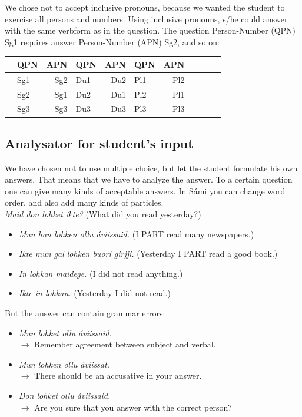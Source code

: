 \documentclass[a4paper,12pt]{article}
\begin{document}
We chose not to accept inclusive pronouns, because we wanted the student to exercise all persons and numbers. Using inclusive pronouns, s/he could answer with the same verbform as in the question. The question Person-Number (QPN) Sg1 requires answer Person-Number (APN) Sg2, and so on:\\


\begin{tabular}[t]{rlrlrlrlrlr}
&QPN &APN &QPN &APN &QPN &APN \\
\hline
&Sg1 &Sg2 &Du1 &Du2 &Pl1 &Pl2 \\
&Sg2 &Sg1 &Du2 &Du1 &Pl2 &Pl1 \\
&Sg3 &Sg3 &Du3 &Du3 &Pl3 &Pl3 \\
\end{tabular}

\subsection{Analysator for student's input}
We have chosen not to use multiple choice, but let the student formulate his own answers. That means that we have to analyze the answer. To a certain question one can give many kinds of acceptable answers. In Sámi you can change word order, and also add many kinds of particles.\\

\textit{Maid don lohket ikte?} (What did you read yesterday?)
\begin{itemize}
\item \textit{Mun han lohken ollu áviissaid.} (I PART read many newspapers.)
\item \textit{Ikte mun gal lohken buori girjji.} (Yesterday I PART read a good book.)
\item \textit{In lohkan maidege.} (I did not read anything.)
\item \textit{Ikte in lohkan.} (Yesterday I did not read.)
\end{itemize}


But the answer can contain grammar errors:
\begin{itemize}
\item \textit{Mun lohket ollu áviissaid.} \\ $\rightarrow$ Remember agreement between subject and verbal.  
\item \textit{Mun lohken ollu áviissat.} \\ $\rightarrow$ There should be an accusative in your answer. 
\item \textit{Don lohket ollu áviissaid.} \\ $\rightarrow$ Are you sure that you answer with the correct person?  
\end{itemize}
\end{document}
